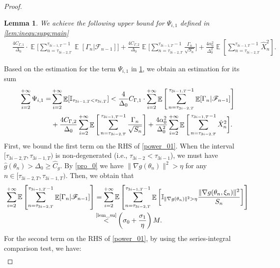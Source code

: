 \documentclass[standalone]{article}
\newcommand{\E}{\mathbb{E}}
\newcommand{\I}{\mathbb{I}}
\newtheorem{lem}{Lemma}[section]
\DeclareMathOperator{\Expect}{\mathbb{E}}
\begin{document}
\begin{proof}
\begin{lem}\label{lem:psi:i1}
We achieve the following upper bound for $\Psi_{i,1}$ defined in \cref{lem:inequ:supg:main}
\begin{align*} %
& \frac{4C_{\Gamma,1}}{\Delta_0}\cdot \Expect\Bigg[\sum_{n=\tau_{3i-2,T}}^{\tau_{3i-1,T}-1}\Expect[\Gamma_n|\mathscr{F}_{n-1}]\Bigg]  + \frac{4C_{\Gamma,2}}{\Delta_0}\Expect\Bigg[\sum_{n=\tau_{3i-2,T}}^{\tau_{3i-1,T}-1}\frac{\Gamma_{n}}{\sqrt{S_{n}}}\Bigg] + \frac{4\alpha_0^{2}}{\Delta_0^{2}}\Expect \left[\sum_{n=\tau_{3i-2,T}}^{\tau_{3i-1,T}-1}\hat{X}_{n}^{2}\right].
\end{align*}
\end{lem}
Based on the estimation for the term $\Psi_{i,1}$ in \cref{lem:psi:i1}, we obtain an estimation for its sum
\begin{align}\label{power_01}
\sum_{i=2}^{+\infty}\Psi_{i,1} 
=&\sum_{i=2}^{+\infty}\Expect[\I_{\tau_{3i-1,T} < \tau_{3i,T}}]<\frac{4}{\Delta_0}C_{\Gamma,1}\cdot \sum_{i=2}^{+\infty}\Expect\Bigg[\sum_{n=\tau_{3i-2,T}}^{\tau_{3i-1,T}-1}\Expect[\Gamma_n|\mathscr{F}_{n-1}]\Bigg]\notag  \\&+ \frac{4C_{\Gamma,2}}{\Delta_0}\sum_{i=2}^{+\infty}\Expect\Bigg[\sum_{n=\tau_{3i-2,T}}^{\tau_{3i-1,T}-1}\frac{\Gamma_{n}}{\sqrt{S_{n}}}\Bigg]  + \frac{4\alpha_0^{2}}{\Delta_0^{2}}\sum_{i=2}^{+\infty}\Expect\Bigg[ \sum_{n=\tau_{3i-2,T}}^{\tau_{3i-1,T}-1}\hat{X}_{n}^{2}\bigg].
\end{align}
First, we bound the first term on the RHS of \cref{power_01}. When the interval $[\tau_{3i-2,T}, \tau_{3i-1,T})$ is non-degenerated (i.e., $\tau_{3i-2} < \tau_{3i-1}$), we must have $\hat{g}(\theta_{n}) > \Delta_0 \geq \hat{C}_{g}$. By \cref{pro_0} we have $\|\nabla g(\theta_{n})\|^{2} > \eta$ for any $n \in [\tau_{3i-2,T}, \tau_{3i-1,T})$. Then, we obtain that
\begin{align}\label{jrnn_00}
\sum_{i=2}^{+\infty}\E\left[\sum_{n=\tau_{3i-2,T}}^{\tau_{3i-1,T}-1}\Expect[\Gamma_n|\mathscr{F}_{n-1}] \right]&=\sum_{i=2}^{+\infty}\E\left[\sum_{n=\tau_{3i-2,T}}^{\tau_{3i-1,T}-1}\Expect\bigg[\I_{\|\nabla g(\theta_{n})\|^{2}>\eta}\frac{\|\nabla g(\theta_{n},\xi_{n})\|^{2}}{S_{n}}\bigg]\right]\notag\\& \mathop{<}^{\text{\cref{lem_su}}} \left(\sigma_0 + \frac{\sigma_1}{\eta} \right)M.
\end{align}
For the second term on the RHS of \cref{power_01}, by using the series-integral comparison test, we have:
\begin{align}\label{jrnn_01}

\end{align}
\end{proof}
\end{document}

